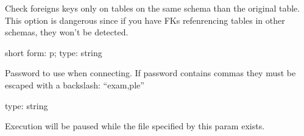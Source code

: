 \documentclass[letterpaper,10pt,english]{sphinxmanual}
\begin{document}
\begin{fulllineitems}
\label{\detokenize{mariadb-schema-change:cmdoption-mariadb-schema-change-only-same-schema-fks}}
\sphinxAtStartPar
Check foreigns keys only on tables on the same schema than the original table.
This option is dangerous since if you have FKs refenrencing tables in other
schemas, they won’t be detected.

\end{fulllineitems}


\begin{fulllineitems}
\label{\detokenize{mariadb-schema-change:cmdoption-mariadb-schema-change-password}}
\sphinxAtStartPar
short form: \sphinxhyphen{}p; type: string

\sphinxAtStartPar
Password to use when connecting.
If password contains commas they must be escaped with a backslash: “exam,ple”

\end{fulllineitems}


\begin{fulllineitems}
\label{\detokenize{mariadb-schema-change:cmdoption-mariadb-schema-change-pause-file}}
\sphinxAtStartPar
type: string

\sphinxAtStartPar
Execution will be paused while the file specified by this param exists.

\end{fulllineitems}
\end{document}
